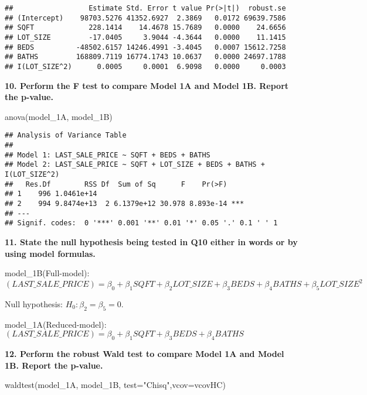 \documentclass[
]{article}
\newenvironment{Shaded}{\begin{snugshade}}{\end{snugshade}}
\newcommand{\AttributeTok}[1]{\textcolor[rgb]{0.77,0.63,0.00}{#1}}
\newcommand{\FunctionTok}[1]{\textcolor[rgb]{0.00,0.00,0.00}{#1}}
\newcommand{\NormalTok}[1]{#1}
\newcommand{\StringTok}[1]{\textcolor[rgb]{0.31,0.60,0.02}{#1}}
\begin{document}
\begin{verbatim}
##                  Estimate Std. Error t value Pr(>|t|)  robust.se
## (Intercept)    98703.5276 41352.6927  2.3869   0.0172 69639.7586
## SQFT             228.1414    14.4678 15.7689   0.0000    24.6656
## LOT_SIZE         -17.0405     3.9044 -4.3644   0.0000    11.1415
## BEDS          -48502.6157 14246.4991 -3.4045   0.0007 15612.7258
## BATHS         168809.7119 16774.1743 10.0637   0.0000 24697.1788
## I(LOT_SIZE^2)      0.0005     0.0001  6.9098   0.0000     0.0003
\end{verbatim}

\textbf{10. Perform the F test to compare Model 1A and Model 1B. Report
the p-value.}

\begin{Shaded}
\begin{Highlighting}[]
\FunctionTok{anova}\NormalTok{(model\_1A, model\_1B)}
\end{Highlighting}
\end{Shaded}

\begin{verbatim}
## Analysis of Variance Table
## 
## Model 1: LAST_SALE_PRICE ~ SQFT + BEDS + BATHS
## Model 2: LAST_SALE_PRICE ~ SQFT + LOT_SIZE + BEDS + BATHS + I(LOT_SIZE^2)
##   Res.Df        RSS Df  Sum of Sq      F    Pr(>F)    
## 1    996 1.0461e+14                                   
## 2    994 9.8474e+13  2 6.1379e+12 30.978 8.893e-14 ***
## ---
## Signif. codes:  0 '***' 0.001 '**' 0.01 '*' 0.05 '.' 0.1 ' ' 1
\end{verbatim}

\textbf{11. State the null hypothesis being tested in Q10 either in
words or by using model formulas.}

model\_1B(Full-model):
\((LAST\_SALE\_PRICE )=\beta_0 + \beta_1 SQFT + \beta_2 LOT\_SIZE + \beta_3 BEDS + \beta_4 BATHS + \beta_5 LOT\_SIZE^2\)

Null hypothesis: \(H_0:\beta_2=\beta_5 = 0\).

model\_1A(Reduced-model):
\((LAST\_SALE\_PRICE) = \beta_0 + \beta_1 SQFT + \beta_3 BEDS + \beta_4 BATHS\)

\textbf{12. Perform the robust Wald test to compare Model 1A and Model
1B. Report the p-value.}

\begin{Shaded}
\begin{Highlighting}[]
\FunctionTok{waldtest}\NormalTok{(model\_1A, model\_1B, }\AttributeTok{test=}\StringTok{"Chisq"}\NormalTok{,}\AttributeTok{vcov=}\NormalTok{vcovHC)}
\end{Highlighting}
\end{Shaded}
\end{document}

